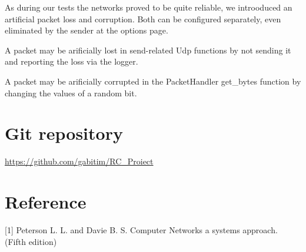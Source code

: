 \documentclass[12pt]{article}
\begin{document}
As during our tests the networks proved to be quite reliable, we introoduced an artificial packet loss and corruption. Both can be configured separately, even eliminated by the sender at the options page.

A packet may be arificially lost in send-related Udp functions by not sending it and reporting the loss via the logger.

A packet may be arificially corrupted in the PacketHandler get\_bytes function by changing the values of a random bit.

\section{Git repository}

\url{https://github.com/gabitim/RC_Proiect}

\section{Reference}

\small

[1] Peterson L. L. and Davie B. S. Computer Networks a systems approach. (Fifth edition)
\end{document}

